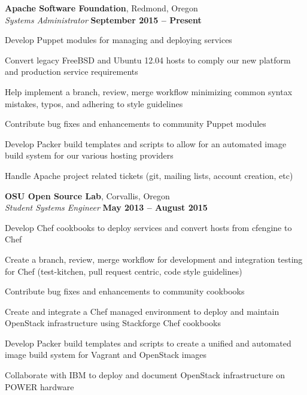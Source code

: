 \documentclass[margin,line]{resume}
\begin{document}
\begin{resume}
    \textbf{Apache Software Foundation}, Redmond, Oregon \vspace{2mm}\\\vspace{1mm}%
    \textsl{Systems Administrator} \hfill \textbf{September 2015 -- Present}\\
    \begin{list2}
        \item Develop Puppet modules for managing and deploying services
        \item Convert legacy FreeBSD and Ubuntu 12.04 hosts to comply our new platform and production service requirements
        \item Help implement a branch, review, merge workflow minimizing common syntax mistakes, typos, and adhering to style guidelines
        \item Contribute bug fixes and enhancements to community Puppet modules
        \item Develop Packer build templates and scripts to allow for an automated image build system for our various hosting providers\\
        \item Handle Apache project related tickets (git, mailing lists, account creation, etc)
    \end{list2}\vspace{-1.5mm}


    \textbf{OSU Open Source Lab}, Corvallis, Oregon \vspace{2mm}\\\vspace{1mm}%
    \textsl{Student Systems Engineer} \hfill \textbf{May 2013 -- August 2015}\\
    \begin{list2}
        \item Develop Chef cookbooks to deploy services and convert hosts from cfengine to Chef
        \item Create a branch, review, merge workflow for development and integration testing for Chef (test-kitchen, pull request centric, code style guidelines)
        \item Contribute bug fixes and enhancements to community cookbooks
        \item Create and integrate a Chef managed environment to deploy and maintain OpenStack infrastructure using Stackforge Chef cookbooks
        \item Develop Packer build templates and scripts to create a unified and automated image build system for Vagrant and OpenStack images
        \item Collaborate with IBM to deploy and document OpenStack infrastructure on POWER hardware\\
    \end{list2}\vspace{-1.5mm}



\end{resume}
\end{document}
